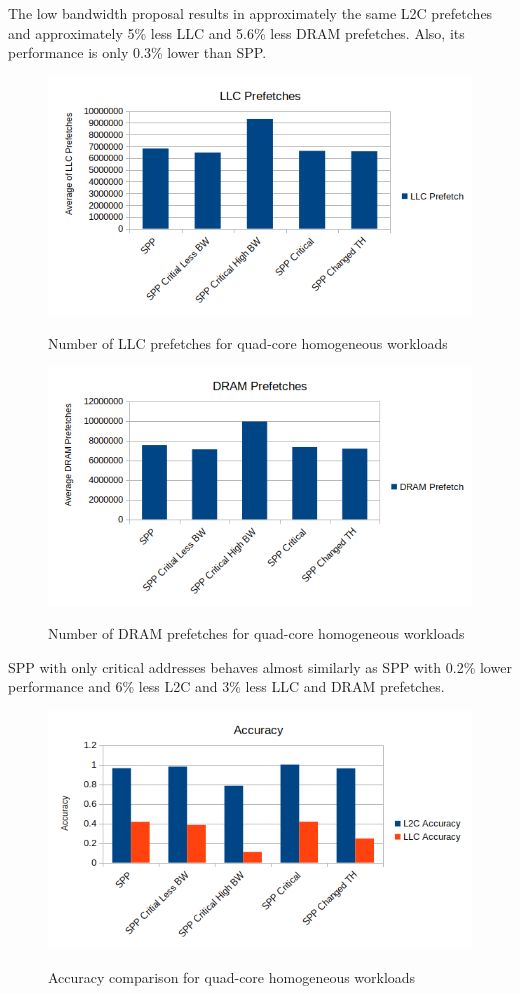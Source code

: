 The low bandwidth proposal results in approximately the same L2C prefetches and approximately 5\% less LLC and 5.6\% less DRAM prefetches. Also, its performance is only 0.3\% lower than SPP.
\begin{figure}[H]
{\includegraphics[scale=0.7]{images/LLC_Homo.png}}
\caption{Number of LLC prefetches for quad-core homogeneous workloads}
\label{fig:multicore-llcpref}
\end{figure}
\begin{figure}[H]
{\includegraphics[scale=0.7]{images/DRAM BW Homo.png}}
\caption{Number of DRAM prefetches for quad-core homogeneous workloads}
\label{fig:multicore-drampref}
\end{figure}

SPP with only critical addresses behaves almost similarly as SPP with 0.2\% lower performance and 6\% less L2C and 3\% less LLC and DRAM prefetches. 
\begin{figure}[H]
{\includegraphics[scale=0.7]{images/Accuracy_homo.png}}
\caption{Accuracy comparison for quad-core homogeneous workloads}
\label{fig:multicore-accuracy}
\end{figure}

